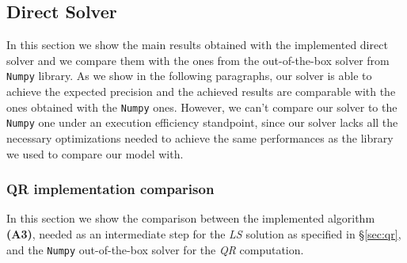 \subsection{Direct Solver}
In this section we show the main results obtained with the implemented direct solver and we compare them with the ones from the out-of-the-box solver from \texttt{Numpy} library. As we show in the following paragraphs, our solver is able to achieve the expected precision and the achieved results are comparable with the ones obtained with the \texttt{Numpy} ones. However, we can't compare our solver to the \texttt{Numpy} one under an execution efficiency standpoint, since our solver lacks all the necessary optimizations needed to achieve the same performances as the library we used to compare our model with.

\subsubsection{QR implementation comparison}
In this section we show the comparison between the implemented algorithm \textbf{(A3)}, needed as an intermediate step for the \textit{LS} solution as specified in \S\ref{sec:qr}, and the \texttt{Numpy} out-of-the-box solver for the \textit{QR} computation.

